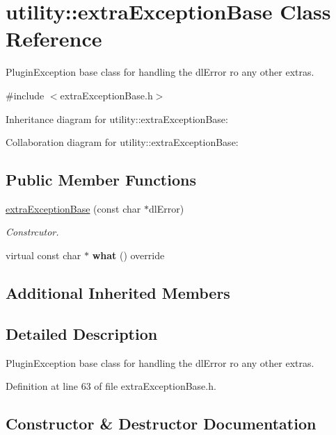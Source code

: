 \hypertarget{classutility_1_1extraExceptionBase}{}\section{utility\+::extra\+Exception\+Base Class Reference}
\label{classutility_1_1extraExceptionBase}


Plugin\+Exception base class for handling the dl\+Error ro any other extras.  




{\ttfamily \#include $<$extra\+Exception\+Base.\+h$>$}



Inheritance diagram for utility\+::extra\+Exception\+Base\+:


Collaboration diagram for utility\+::extra\+Exception\+Base\+:
\subsection*{Public Member Functions}
\begin{DoxyCompactItemize}
\item 
\mbox{\hyperlink{classutility_1_1extraExceptionBase_a97fdac932083770fbaa2a751d8275281}{extra\+Exception\+Base}} (const char $\ast$dl\+Error)
\begin{DoxyCompactList}\small\item\em Constrcutor. \end{DoxyCompactList}\item 
\mbox{\label{classutility_1_1extraExceptionBase_adf8d575b1c7c9ebc40d1983280599b35}} 
virtual const char $\ast$ {\bfseries what} () override
\end{DoxyCompactItemize}
\subsection*{Additional Inherited Members}


\subsection{Detailed Description}
Plugin\+Exception base class for handling the dl\+Error ro any other extras. 

Definition at line 63 of file extra\+Exception\+Base.\+h.



\subsection{Constructor \& Destructor Documentation}
\mbox{\label{classutility_1_1extraExceptionBase_a97fdac932083770fbaa2a751d8275281}} 
